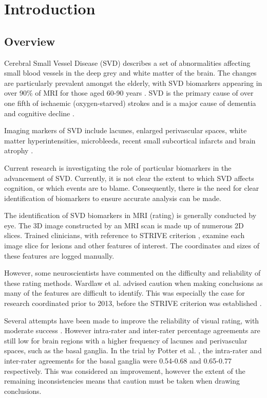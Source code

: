 %
%

\chapter{Introduction}\label{s-intro}

\section{Overview}\label{overview}

{\noindent} Cerebral Small Vessel Disease (SVD) describes a set of abnormalities affecting small blood vessels in the deep grey and white matter of the brain. The changes are particularly prevalent amongst the elderly, with SVD biomarkers appearing in over 90\% of MRI for those aged 60-90 years \cite{deLeeuwF-E2001Pocw}. SVD is the primary cause of over one fifth of ischaemic (oxygen-starved) strokes \cite{SmithStephen2002ARaA} and is a major cause of dementia and cognitive decline \cite{NorrvingBo2008Linb}.

Imaging markers of SVD include lacunes, enlarged perivascular spaces, white matter hyperintensities, microbleeds, recent small subcortical infarcts and brain atrophy \cite{WardlawJ.M.2013Nsfr}.

Current research is investigating the role of particular biomarkers in the advancement of SVD. Currently, it is not clear the extent to which SVD affects cognition, or which events are to blame. Consequently, there is the need for clear identification of biomarkers to ensure accurate analysis can be made.

The identification of SVD biomarkers in MRI (rating) is generally conducted by eye. The 3D image constructed by an MRI scan is made up of numerous 2D slices. Trained clinicians, with reference to STRIVE criterion \cite{WardlawJ.M.2013Nsfr}, examine each image slice for lesions and other features of interest. The coordinates and sizes of these features are logged manually.

However, some neuroscientists have commented on the difficulty and reliability of these rating methods. Wardlaw et al. \cite{WardlawJm2013Mosc} advised caution when making conclusions as many of the features are difficult to identify. This was especially the case for research coordinated prior to 2013, before the STRIVE criterion was established \cite{WardlawJ.M.2013Nsfr}.

Several attempts have been made to improve the reliability of visual rating, with moderate success \cite{AdamsH.H.Hieab2013RMfD, PotterGillian2015CPSV}. However intra-rater and inter-rater percentage agreements are still low for brain regions with a higher frequency of lacunes and perivascular spaces, such as the basal ganglia. In the trial by Potter et al. \cite{PotterGillian2015CPSV},  the intra-rater and inter-rater agreements for the basal ganglia were 0.54-0.68 and 0.65-0.77 respectively. This was considered an improvement, however the extent of the remaining inconsistencies means that caution must be taken when drawing conclusions.

